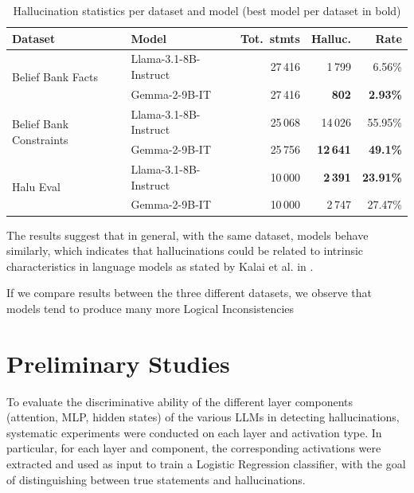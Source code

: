 \begin{table}[H]
\centering
\small
\begin{tabular}{llrrr}
    \toprule
    \textbf{Dataset} & \textbf{Model} & \textbf{Tot.\ stmts} & \textbf{Halluc.} & \textbf{Rate} \\
    \midrule
    \multirow{2}{*}{Belief Bank Facts}
        & Llama-3.1-8B-Instruct & 27\,416 & 1\,799 & 6.56\% \\
        & Gemma-2-9B-IT         & 27\,416 & \textbf{802} & \textbf{2.93\%} \\
    \midrule
    \multirow{2}{*}{Belief Bank Constraints}
        & Llama-3.1-8B-Instruct & 25\,068 & 14\,026 & 55.95\% \\
        & Gemma-2-9B-IT         & 25\,756 & \textbf{12\,641} & \textbf{49.1\%} \\
    \midrule
    \multirow{2}{*}{Halu Eval}
        & Llama-3.1-8B-Instruct & 10\,000 & \textbf{2\,391} & \textbf{23.91\%} \\
        & Gemma-2-9B-IT         & 10\,000 & 2\,747 & 27.47\% \\
    \bottomrule
\end{tabular}
\caption{Hallucination statistics per dataset and model (best model per dataset in bold)}
\label{tab:hallucination-stats}
\end{table}


The results suggest that in general, with the same dataset, models behave similarly, which indicates that hallucinations could be related to intrinsic characteristics in language models as stated by Kalai et al. in \cite{HallOpenAI}.

If we compare results between the three different datasets, we observe that models tend to produce many more Logical Inconsistencies




\section{Preliminary Studies}



To evaluate the discriminative ability of the different layer components (attention, MLP, hidden states) of the various LLMs in detecting hallucinations, systematic experiments were conducted on each layer and activation type. In particular, for each layer and component, the corresponding activations were extracted and used as input to train a Logistic Regression classifier, with the goal of distinguishing between true statements and hallucinations.

